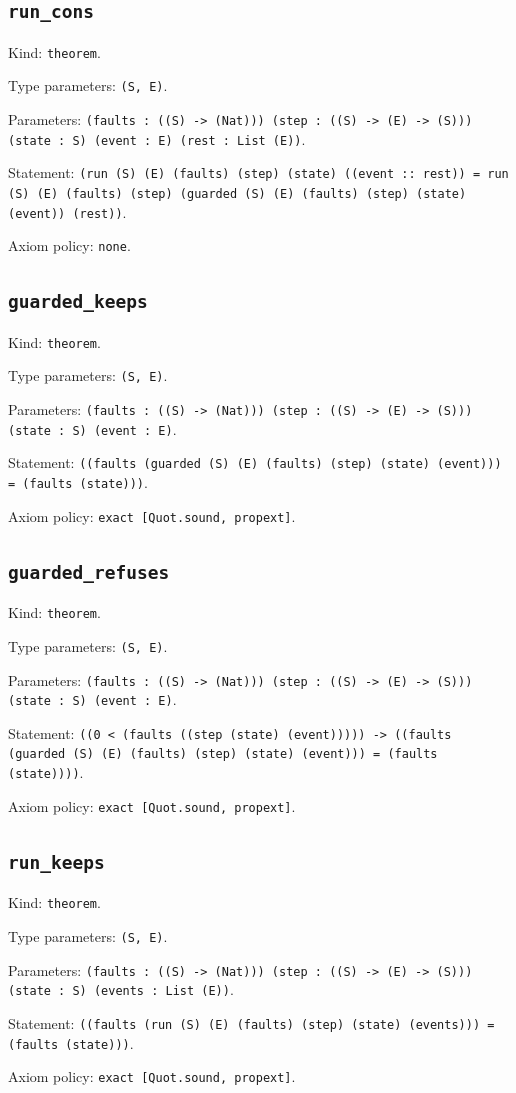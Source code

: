 \documentclass[11pt]{article}
\begin{document}
\subsection*{\texttt{run\_cons}}
\noindent Kind: \texttt{theorem}.\par
\noindent Type parameters: \texttt{(S, E)}.\par
\noindent Parameters: \texttt{(faults : ((S) -> (Nat))) (step : ((S) -> (E) -> (S))) (state : S) (event : E) (rest : List (E))}.\par
\noindent Statement: \texttt{(run (S) (E) (faults) (step) (state) ((event :: rest)) = run (S) (E) (faults) (step) (guarded (S) (E) (faults) (step) (state) (event)) (rest))}.\par
\noindent Axiom policy: \texttt{none}.\par
\subsection*{\texttt{guarded\_keeps}}
\noindent Kind: \texttt{theorem}.\par
\noindent Type parameters: \texttt{(S, E)}.\par
\noindent Parameters: \texttt{(faults : ((S) -> (Nat))) (step : ((S) -> (E) -> (S))) (state : S) (event : E)}.\par
\noindent Statement: \texttt{((faults (guarded (S) (E) (faults) (step) (state) (event))) = (faults (state)))}.\par
\noindent Axiom policy: \texttt{exact [Quot.sound, propext]}.\par
\subsection*{\texttt{guarded\_refuses}}
\noindent Kind: \texttt{theorem}.\par
\noindent Type parameters: \texttt{(S, E)}.\par
\noindent Parameters: \texttt{(faults : ((S) -> (Nat))) (step : ((S) -> (E) -> (S))) (state : S) (event : E)}.\par
\noindent Statement: \texttt{((0 < (faults ((step (state) (event))))) -> ((faults (guarded (S) (E) (faults) (step) (state) (event))) = (faults (state))))}.\par
\noindent Axiom policy: \texttt{exact [Quot.sound, propext]}.\par
\subsection*{\texttt{run\_keeps}}
\noindent Kind: \texttt{theorem}.\par
\noindent Type parameters: \texttt{(S, E)}.\par
\noindent Parameters: \texttt{(faults : ((S) -> (Nat))) (step : ((S) -> (E) -> (S))) (state : S) (events : List (E))}.\par
\noindent Statement: \texttt{((faults (run (S) (E) (faults) (step) (state) (events))) = (faults (state)))}.\par
\noindent Axiom policy: \texttt{exact [Quot.sound, propext]}.\par
\end{document}
